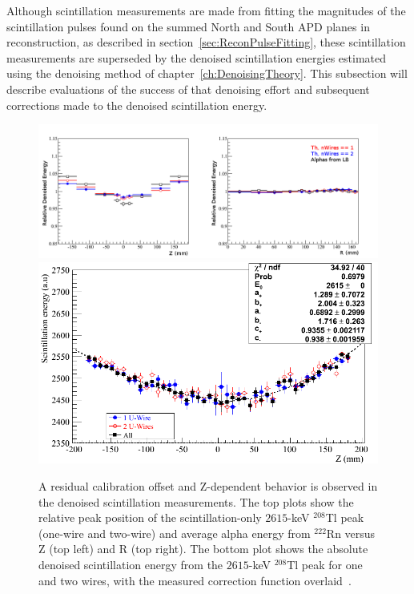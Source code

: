 Although scintillation measurements are made from fitting the magnitudes of the scintillation pulses found on the summed North and South APD planes in reconstruction, as described in section~\ref{sec:ReconPulseFitting}, these scintillation measurements are superseded by the denoised scintillation energies estimated using the denoising method of chapter~\ref{ch:DenoisingTheory}.  This subsection will describe evaluations of the success of that denoising effort and subsequent corrections made to the denoised scintillation energy.

\begin{figure}
\begin{center}
\includegraphics[keepaspectratio=true,width=\textwidth,clip=true,trim=0mm 0mm 20mm 0mm]{DenoisedScintillatonRelativeRZBias.png}
\includegraphics[keepaspectratio=true,width=\textwidth]{DenoisedScintillatonZBias.png}
\end{center}
\renewcommand{\baselinestretch}{1}
\small\normalsize
\begin{quote}
\caption{A residual calibration offset and Z-dependent behavior is observed in the denoised scintillation measurements.  The top plots show the relative peak position of the scintillation-only $2615$-keV $^{208}$Tl peak (one-wire and two-wire) and average alpha energy from $^{222}$Rn versus Z (top left) and R (top right).  The bottom plot shows the absolute denoised scintillation energy from the $2615$-keV $^{208}$Tl peak for one and two wires, with the measured correction function overlaid~\cite{EnergyDocumentRun2ab}.}
\label{fig:ResidualLightZBias}
\end{quote}
\end{figure}
\renewcommand{\baselinestretch}{2}
\small\normalsize

